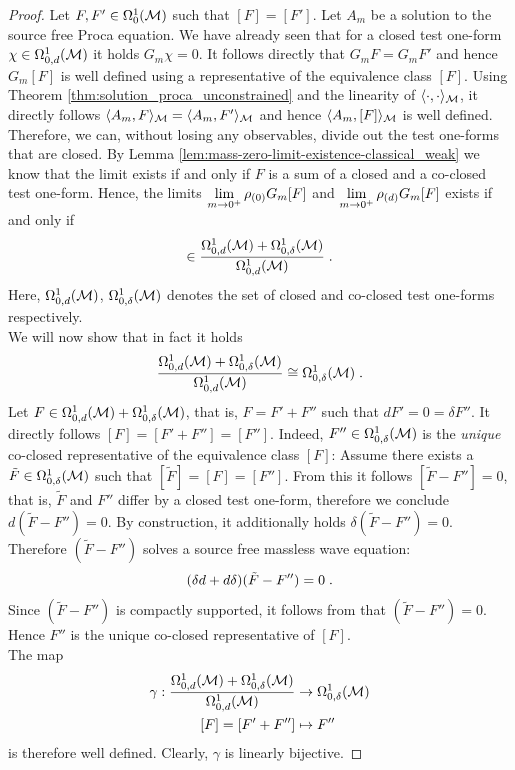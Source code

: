 \begin{proof}
	Let $F, F' \in \Omega^1_0(\mathcal{M})$ such that $[F] = [F']$. Let $A_m$ be a solution to the source free Proca equation.
	We have already seen that for a closed test one-form $\chi \in \Omega^1_{0,d}(\mathcal{M})$ it holds $G_m \chi =0$. It follows directly that $G_m F = G_m F'$ and hence $G_m [F]$ is well defined using a representative of the equivalence class $[F]$. Using Theorem \ref{thm:solution_proca_unconstrained} and the linearity of $\langle \cdot, \cdot \rangle_{\mathcal{M}}$, it directly follows $\langle A_m, F \rangle_{\mathcal{M}} =\langle A_m, F' \rangle_{\mathcal{M}}$ and hence $\langle A_m, [F] \rangle_{\mathcal{M}}$ is well defined. Therefore, we can, without losing any observables, divide out the test one-forms that are closed.
	By Lemma \ref{lem:mass-zero-limit-existence-classical_weak} we know that the limit exists if and only if $F$ is a sum of a closed and a co-closed test one-form. Hence, the limits $\lim\limits_{m \to 0^+} \rho_{(0)} G_m [F]$ and  $\lim\limits_{m \to 0^+} \rho_{(d)} G_m [F]$ exists if and only if
	\begin{align}
		[F] \in \frac{\Omega^1_{0,d}(\M) + \Omega^1_{0,\delta}(\M)}{\Omega^1_{0,d}(\M)}\formspace.
	\end{align}
	Here, $\Omega^1_{0,d}(\mathcal{M})$, $\Omega^1_{0,\delta}(\mathcal{M})$ denotes the set of closed and co-closed test one-forms respectively.\\
	We will now show that in fact it holds
	\begin{align}
		\frac{\Omega^1_{0,d}(\mathcal{M}) + \Omega^1_{0,\delta}(\mathcal{M})}{\Omega^1_{0,d}(\mathcal{M})} \cong \Omega^1_{0,\delta}(\mathcal{M}) \;.
	\end{align}
	Let $F \in \Omega^1_{0,d}(\mathcal{M}) + \Omega^1_{0,\delta}(\mathcal{M})$, that is, $F = F' + F''$ such that $dF' = 0 = \delta F''$. It directly follows $[F] = [F' + F''] = [F'']$. Indeed, $F'' \in \Omega^1_{0,\delta}(\mathcal{M})$ is the \emph{unique} co-closed representative of the equivalence class $[F]$: Assume there exists a $\tilde{F} \in \Omega^1_{0,\delta}(\mathcal{M})$ such that $[\tilde{F}] = [F] = [F'']$. From this it follows $[\tilde{F} - F''] = 0$, that is, $\tilde{F}$ and $F''$ differ by a closed test one-form, therefore we conclude $d(\tilde{F} - F'') = 0$.	By construction, it additionally holds $\delta(\tilde{F} - F'') =0$. Therefore $(\tilde{F} - F'')$ solves a source free massless wave equation:
	\begin{align}
		(\delta d + d \delta)(\tilde{F} - F'') = 0 \;.
	\end{align}
	Since $(\tilde{F} - F'')$ is compactly supported, it follows from \cite[Corollary 3.2.4]{baer_ginoux_pfaeffle} that $(\tilde{F} - F'') =0$. Hence $F''$ is the unique co-closed representative of $[F]$. \\
	The map
	\begin{align}
		\gamma : \frac{\Omega^1_{0,d}(\mathcal{M}) + \Omega^1_{0,\delta}(\mathcal{M})}{\Omega^1_{0,d}(\mathcal{M})} &\to \Omega^1_{0,\delta}(\mathcal{M})\\
		[F] = [F' + F''] &\mapsto F'' \notag
	\end{align}
	is therefore well defined. Clearly, $\gamma$ is linearly bijective.
\end{proof}
